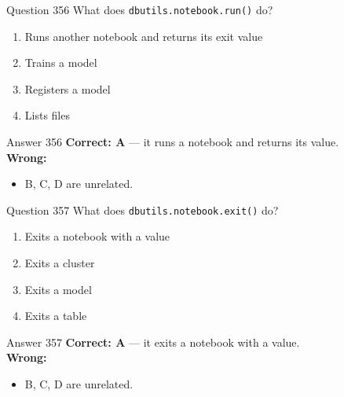 \documentclass[aspectratio=169,11pt]{beamer}
\begin{document}
	\begin{frame}{Question 356}
		What does \texttt{dbutils.notebook.run()} do?
		\begin{enumerate}[label=\Alph*.]
			\item Runs another notebook and returns its exit value
			\item Trains a model
			\item Registers a model
			\item Lists files
		\end{enumerate}
	\end{frame}
	\begin{frame}{Answer 356}
		\textbf{Correct: A} --- it runs a notebook and returns its value.\\
		\vspace{0.5em}
		\textbf{Wrong:}
		\begin{itemize}
			\item B, C, D are unrelated.
		\end{itemize}
	\end{frame}
	
	\begin{frame}{Question 357}
		What does \texttt{dbutils.notebook.exit()} do?
		\begin{enumerate}[label=\Alph*.]
			\item Exits a notebook with a value
			\item Exits a cluster
			\item Exits a model
			\item Exits a table
		\end{enumerate}
	\end{frame}
	\begin{frame}{Answer 357}
		\textbf{Correct: A} --- it exits a notebook with a value.\\
		\vspace{0.5em}
		\textbf{Wrong:}
		\begin{itemize}
			\item B, C, D are unrelated.
		\end{itemize}
	\end{frame}
	
\end{document}

